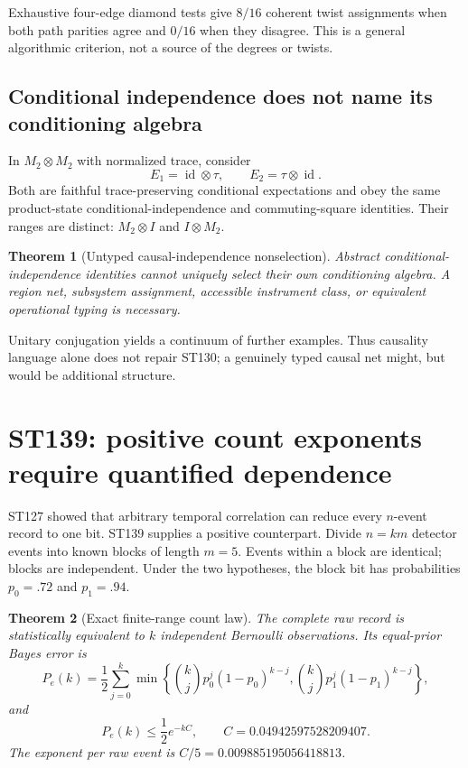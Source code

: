 \documentclass[11pt,a4paper]{article}
\newtheorem{theorem}{Theorem}[section]
\begin{document}
Exhaustive four-edge diamond tests give $8/16$ coherent twist assignments when both path parities agree and $0/16$ when they disagree. This is a general algorithmic criterion, not a source of the degrees or twists.

\subsection{Conditional independence does not name its conditioning algebra}

In $M_2\otimes M_2$ with normalized trace, consider
\[
E_1=\operatorname{id}\otimes\tau,
\qquad E_2=\tau\otimes\operatorname{id}.
\]
Both are faithful trace-preserving conditional expectations and obey the same product-state conditional-independence and commuting-square identities. Their ranges are distinct: $M_2\otimes I$ and $I\otimes M_2$.

\begin{theorem}[Untyped causal-independence nonselection]
Abstract conditional-independence identities cannot uniquely select their own conditioning algebra. A region net, subsystem assignment, accessible instrument class, or equivalent operational typing is necessary.
\end{theorem}

Unitary conjugation yields a continuum of further examples. Thus causality language alone does not repair ST130; a genuinely typed causal net might, but would be additional structure.

\section{ST139: positive count exponents require quantified dependence}

ST127 showed that arbitrary temporal correlation can reduce every $n$-event record to one bit. ST139 supplies a positive counterpart. Divide $n=km$ detector events into known blocks of length $m=5$. Events within a block are identical; blocks are independent. Under the two hypotheses, the block bit has probabilities $p_0=.72$ and $p_1=.94$.

\begin{theorem}[Exact finite-range count law]
The complete raw record is statistically equivalent to $k$ independent Bernoulli observations. Its equal-prior Bayes error is
\[
P_e(k)=\frac12\sum_{j=0}^{k}\min\left\{\binom kjp_0^j(1-p_0)^{k-j},
\binom kjp_1^j(1-p_1)^{k-j}\right\},
\]
and
\[
P_e(k)\le\frac12e^{-kC},\qquad C=0.04942597528209407.
\]
The exponent per raw event is $C/5=0.009885195056418813$.
\end{theorem}
\end{document}
